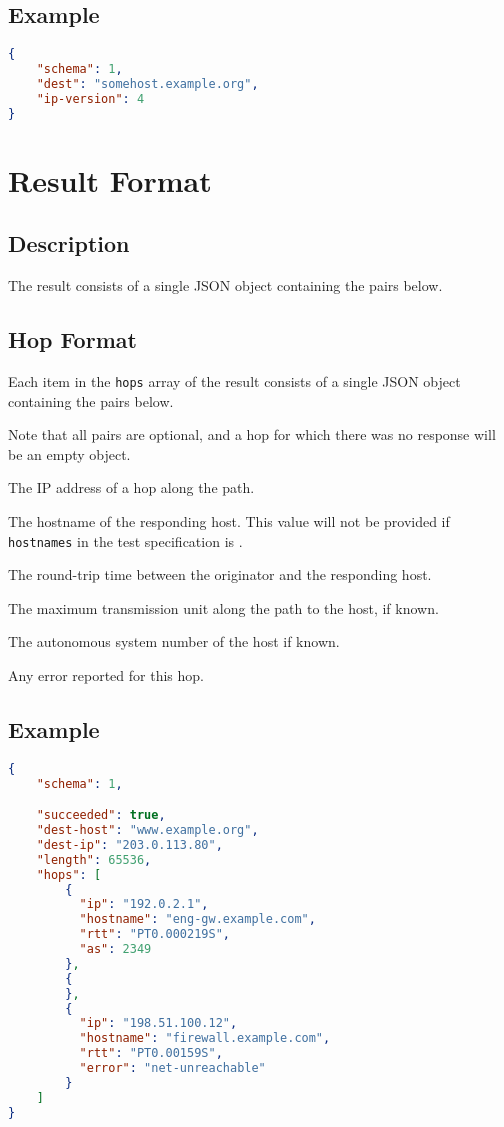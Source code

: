 \documentclass[10pt]{article}
\begin{document}
\subsection{Example}
\begin{lstlisting}[language=json]
{
    "schema": 1,
    "dest": "somehost.example.org",
    "ip-version": 4
}
\end{lstlisting}



%
%

\section{Result Format}

\subsection{Description}
The result consists of a single JSON object containing the pairs
below.  \seejson


\subsection{Hop Format}

Each item in the {\tt hops} array of the result consists of a single
JSON object containing the pairs below.  \seejson

Note that  all pairs are  optional, and a  hop for which there  was no
response will be an empty object.

 The IP address of a hop along the path.

 The hostname of the responding host.  This
value will not be provided if {\tt hostnames} in the test
specification is \false.

 The round-trip time between the originator
and the responding host.

 The maximum transmission unit along the path
to the host, if known.

 The autonomous system number of the host if
known.

 Any error reported for this hop.

\subsection{Example}
\begin{lstlisting}[language=json]
{
    "schema": 1,

    "succeeded": true,
    "dest-host": "www.example.org",
    "dest-ip": "203.0.113.80",
    "length": 65536,
    "hops": [
        {
          "ip": "192.0.2.1",
          "hostname": "eng-gw.example.com",
          "rtt": "PT0.000219S",
          "as": 2349
        },
        {
        },
        {
          "ip": "198.51.100.12",
          "hostname": "firewall.example.com",
          "rtt": "PT0.00159S",
          "error": "net-unreachable"
        }
    ]
}
\end{lstlisting}
\end{document}
